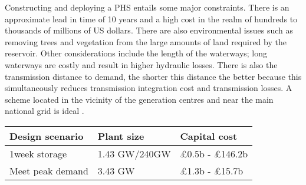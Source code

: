 
Constructing and deploying a PHS entails some major constraints. There is an
approximate lead in time of 10 years and a high cost in the realm of hundreds
to thousands of millions of US dollars. There are also environmental issues
such as removing trees and vegetation from the large amounts of land required
by the reservoir. Other considerations include the length of the waterways;
long waterways are costly and result in higher hydraulic losses. There is also
the transmission distance to demand, the shorter this distance the better
because this simultaneously reduces transmission integration cost and
transmission losses. A scheme located in the vicinity of the generation centres
and near the main national grid is ideal \citep{Louwinger2008}.

\begin{table}[htbp]
\begin{tabular}{@{}lll@{}}
\toprule
Design scenario & Plant size & Capital cost \\ \midrule
1week storage & 1.43 GW/240GW & £0.5b - £146.2b \\
Meet peak demand & 3.43 GW & £1.3b - £15.7b \\ \bottomrule
\end{tabular}
\end{table}

%
%


